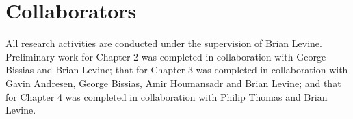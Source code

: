 \section*{Collaborators}
All research activities are conducted under the supervision of Brian Levine. Preliminary work for Chapter 2 was completed in collaboration with George Bissias and Brian Levine; that for Chapter 3 was completed in collaboration with Gavin Andresen, George Bissias, Amir Houmansadr and Brian Levine; and that for Chapter 4 was completed in collaboration with Philip Thomas and Brian Levine.